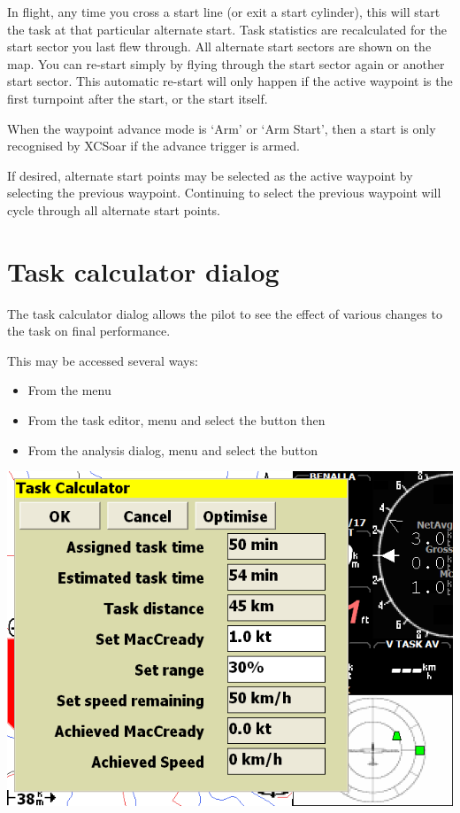 \documentclass[a4paper,12pt]{refrep}
\begin{document}
  In flight, any time you cross a start line (or exit a start
  cylinder), this will start the task at that particular alternate
  start.  Task statistics are recalculated for the start sector you
  last flew through.  All alternate start sectors are shown on the
  map.  You can re-start simply by flying through the start sector
  again or another start sector.  This automatic re-start will only
  happen if the active waypoint is the first turnpoint after the
  start, or the start itself.

  When the waypoint advance mode is `Arm' or `Arm Start', then a start
  is only recognised by XCSoar if the advance trigger is armed.

  If desired, alternate start points may be selected as the active
  waypoint by selecting the previous waypoint.  Continuing to select
  the previous waypoint will cycle through all alternate start points.

\section{Task calculator dialog}\label{sec:task-calc-dial}
The task calculator dialog allows the pilot to see the effect of
various changes to the task on final performance.

This may be accessed several ways:
\begin{itemize}
\item From the menu 
\begin{quote}
\blink{}
\end{quote}
\item From the task editor, menu \blink{} and select
 the button  then 
\item From the analysis dialog, menu \blink{} and select
 the button 
\end{itemize}

\begin{center}
\includegraphics[angle=0,width=\linewidth,keepaspectratio='true']{figures/dialog-taskcalc3.png}
\end{center}
\end{document}

